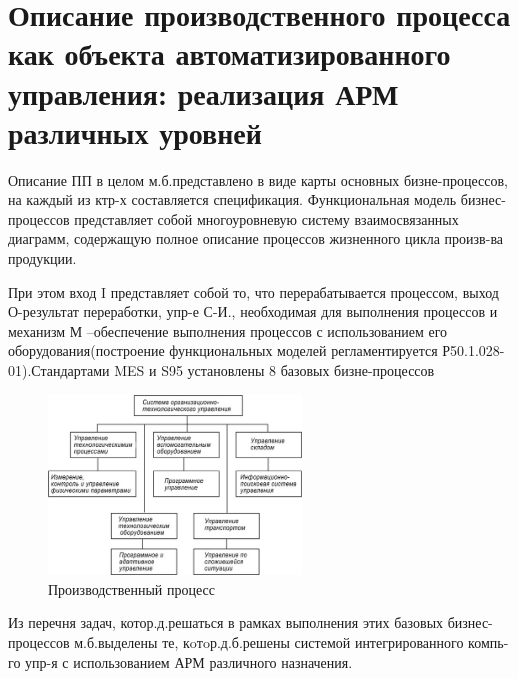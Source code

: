 \documentclass[unicode, 12pt, a4paper, oneside]{article}
\begin{document}
\section{Описание производственного процесса как объекта автоматизированного управления: реализация АРМ различных уровней}

Описание ПП в целом м.б.представлено в виде карты основных бизне-процессов, на каждый из ктр-х составляется спецификация. Функциональная модель бизнес-процессов представляет собой многоуровневую систему взаимосвязанных диаграмм, содержащую полное описание процессов жизненного цикла произв-ва продукции.

При этом вход I представляет собой то, что перерабатывается процессом, выход О-результат переработки, упр-е С-И., необходимая для выполнения процессов и механизм М –обеспечение выполнения процессов с использованием его оборудования(построение функциональных моделей регламентируется Р50.1.028-01).Стандартами MES и S95 установлены 8 базовых бизне-процессов

\begin{figure}[H]
\centering
\includegraphics[width=0.6\textwidth]{49_proizv_proces.jpg}
\caption{Производственный процесс}
\end{figure}

Из перечня задач, котор.д.решаться в рамках выполнения этих базовых бизнес-процессов м.б.выделены те, кoтoр.д.б.решены системой интегрированного компь-го упр-я с использованием АРМ различного назначения.
\end{document}
